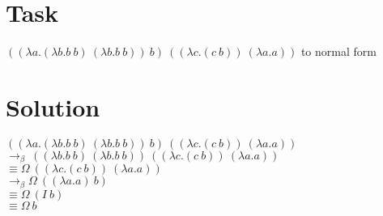 \documentclass{article}
\begin{document}
\begin{center}

\section*{Task}
{\Large$((\lambda a.(\lambda b.b\ b)\ (\lambda b.b\ b))\ b)\ ((\lambda c.(c\ b))\ (\lambda a.a))$ to normal form}\\


\section*{Solution}
    
{\Large$((\lambda a.(\lambda b.b\ b)\ (\lambda b.b\ b))\ b)\ ((\lambda c.(c\ b))\ (\lambda a.a))$\\
$\rightarrow_\beta\ ((\lambda b.b\ b)\ (\lambda b.b\ b))\ ((\lambda c.(c\ b))\ (\lambda a.a))$\\
$\equiv \Omega \ ((\lambda c.(c\ b))\ (\lambda a.a))$\\
$\rightarrow_\beta\Omega\ ((\lambda a.a)\ b)$\\
$\equiv \Omega\ (I\ b)$\\
$\equiv \Omega\ b$}

\end{center}
\end{document}
